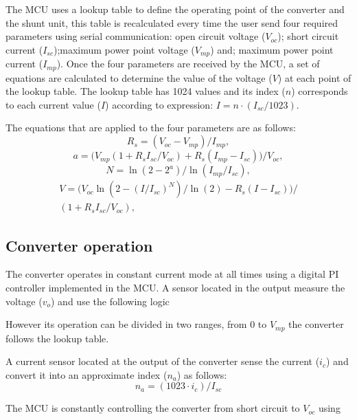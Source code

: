\documentclass[conference]{IEEEtran}
\begin{document}
The MCU uses a lookup table to define the operating point of the converter and the shunt unit, this table is recalculated every time the user send four required parameters using serial communication: open circuit voltage ($V_{oc}$); short circuit current ($I_{sc}$);maximum power point voltage ($V_{mp}$) and; maximum power point current ($I_{mp}$). Once the four parameters are received by the MCU, a set of equations \cite{equations} are calculated to determine the value of the voltage ($V$) at each point of the lookup table. The lookup table has 1024 values and its index ($n$) corresponds to each current value ($I$) according to expression: $I = n \cdot (I_{sc} / 1023)$. 

The equations that are applied to the four parameters are as follows:
\begin{equation}
    R_s = \left(V_{oc} - V_{mp}\right) / I_{mp},
\end{equation}
\begin{equation}
    a = \bm{(}V_{mp} ( 1 + R_s I_{sc}/ V_{oc}) + R_s ( I_{mp} - I_{sc})\bm{)} / V_{oc},
\end{equation}
\begin{equation}
    N = \ln(2-2^{a}) / \ln(I_{mp}/I_{sc}),
\end{equation}
\begin{multline}
    V = \bm{(} V_{oc} \ln ( 2 - (I/I_{sc})^N ) / \ln(2)  - R_s (I - I_{sc})\bm{)} / \\ (1 + R_s I_{sc}/V_{oc}),
\end{multline}

\subsection{Converter operation}
The converter operates in constant current mode at all times using a digital PI controller implemented in the MCU. A sensor located in the output measure the voltage ($v_o$) and use the following logic


However its operation can be divided in two ranges, from 0 to $V_{mp}$ the converter follows the lookup table.

A current sensor located at the output of the converter sense the current ($i_c$) and convert it into an approximate index ($n_a$) as follows:
\begin{equation}
    n_a = (1023 \cdot i_c) / I_{sc}  
\end{equation}


The MCU is constantly controlling the converter from short circuit to $V_{oc}$ using 
\end{document}
